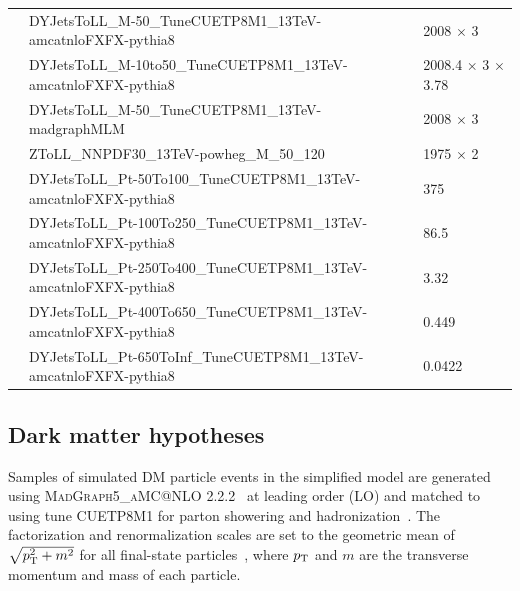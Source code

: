 \begin{table}
\begin{center}
{\begin{tabular}{|p{3.0cm}|p{13cm}|p{3.5cm}|}
       & DYJetsToLL\_M-50\_TuneCUETP8M1\_13TeV-amcatnloFXFX-pythia8         & 2008 $\times$ 3 \\ 
       & DYJetsToLL\_M-10to50\_TuneCUETP8M1\_13TeV-amcatnloFXFX-pythia8 & 2008.4 $\times$ 3 $\times$ 3.78 \\ 
       & DYJetsToLL\_M-50\_TuneCUETP8M1\_13TeV-madgraphMLM                  & 2008 $\times$ 3 \\ 
       & ZToLL\_NNPDF30\_13TeV-powheg\_M\_50\_120                           & 1975 $\times$ 2 \\ 
       & DYJetsToLL\_Pt-50To100\_TuneCUETP8M1\_13TeV-amcatnloFXFX-pythia8   & 375             \\ 
       & DYJetsToLL\_Pt-100To250\_TuneCUETP8M1\_13TeV-amcatnloFXFX-pythia8  & 86.5            \\ 
       & DYJetsToLL\_Pt-250To400\_TuneCUETP8M1\_13TeV-amcatnloFXFX-pythia8  & 3.32            \\ 
       & DYJetsToLL\_Pt-400To650\_TuneCUETP8M1\_13TeV-amcatnloFXFX-pythia8  & 0.449           \\ 
       & DYJetsToLL\_Pt-650ToInf\_TuneCUETP8M1\_13TeV-amcatnloFXFX-pythia8  & 0.0422          \\ 
       \hline 

         \end{tabular}
         }
           \end{center}
           \end{table}
\clearpage
\subsection{Dark matter hypotheses}
Samples of simulated DM particle events in the simplified model are generated using \textsc{MadGraph5\_aMC@NLO 2.2.2}~\cite{Alwall:2014hca} at leading order (LO) and matched to
~\cite{Sjostrand:2007gs} using tune CUETP8M1 for parton showering and hadronization~\cite{Khachatryan:2015pea,Skands:2014pea}.
The factorization and re\-nor\-ma\-li\-zat\-ion scales are set to the geometric mean of $\sqrt{p_{\mathrm{T}}^2+m^2}$ for all final-state particles~\cite{Alwall:2014hca,Abercrombie:2015wmb}, where $p_{\mathrm{T}}$ and $m$ are the transverse momentum and mass of each particle.

